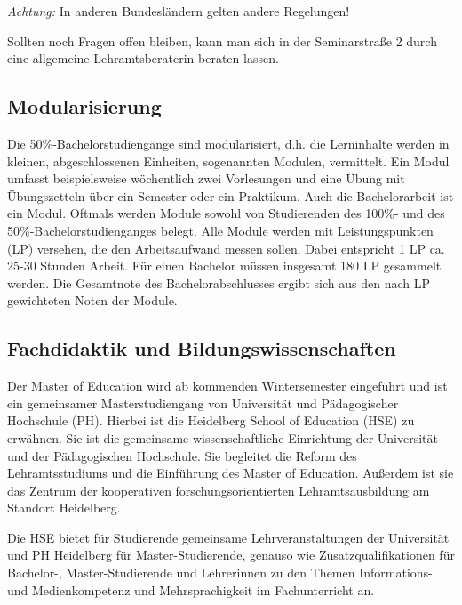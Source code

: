 \emph{Achtung:} In anderen Bundesländern gelten andere Regelungen!

Sollten noch Fragen offen bleiben, kann man sich in der Seminarstraße 2 durch eine allgemeine Lehramtsberaterin beraten lassen. 



\subsection{Modularisierung}
Die 50\%-Bachelorstudiengänge sind modularisiert, d.h. die Lerninhalte werden in kleinen, abgeschlossenen Einheiten, sogenannten Modulen, vermittelt. Ein Modul umfasst beispielsweise wöchentlich zwei Vorlesungen und eine Übung mit Übungszetteln über ein Semester oder ein Praktikum. Auch die Bachelorarbeit ist ein Modul. Oftmals werden Module sowohl von Studierenden des 100\%- und des 50\%-Bachelorstudienganges belegt. Alle Module werden mit Leistungspunkten (\gls{LP}) versehen, die den Arbeitsaufwand messen sollen. Dabei entspricht 1 \gls{LP} ca. 25-30 Stunden Arbeit. Für einen Bachelor müssen insgesamt 180 \gls{LP} gesammelt werden. Die Gesamtnote des Bachelorabschlusses ergibt sich aus den nach \gls{LP} gewichteten Noten der Module.

\subsection{Fachdidaktik und Bildungswissenschaften}
Der Master of Education wird ab kommenden Wintersemester eingeführt und ist ein gemeinsamer Masterstudiengang von Universität und Pädagogischer Hochschule (PH). Hierbei ist die Heidelberg School of  Education (HSE) zu erwähnen. Sie ist die gemeinsame wissenschaftliche Einrichtung der Universität und der Pädagogischen Hochschule. Sie begleitet die Reform des Lehramtsstudiums und die Einführung des Master of Education. Außerdem ist sie das Zentrum der kooperativen forschungsorientierten Lehramtsausbildung am Standort Heidelberg. 

Die HSE bietet für Studierende gemeinsame Lehrveranstaltungen der Universität und PH Heidelberg für Master-Studierende, genauso wie Zusatzqualifikationen für Bachelor-, Master-Studierende und Lehrerinnen zu den Themen Informations- und Medienkompetenz und Mehrsprachigkeit im Fachunterricht an. 


